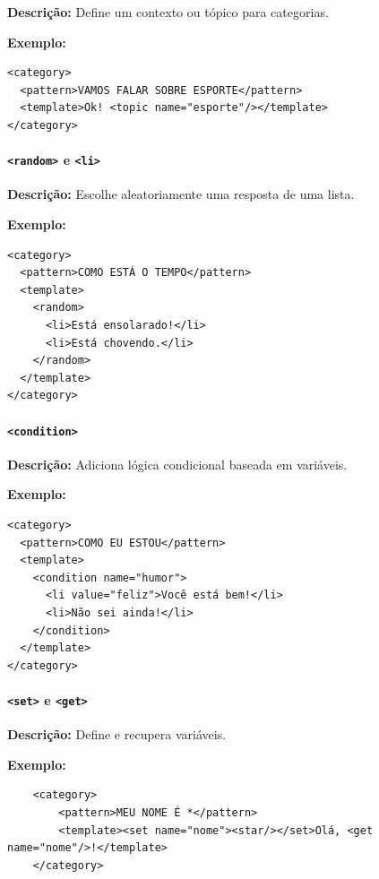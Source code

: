 \documentclass[a4paper,oneside]{book}
\begin{document}
\textbf{Descrição:} Define um contexto ou tópico para categorias. 

\textbf{Exemplo:}

\begin{verbatim}
<category>
  <pattern>VAMOS FALAR SOBRE ESPORTE</pattern>
  <template>Ok! <topic name="esporte"/></template>
</category>
\end{verbatim}

\paragraph{\texttt{<random>} e \texttt{<li>}} 

\textbf{Descrição:} Escolhe aleatoriamente uma resposta de uma lista. 

\textbf{Exemplo:}

\begin{verbatim}
<category>
  <pattern>COMO ESTÁ O TEMPO</pattern>
  <template>
    <random>
      <li>Está ensolarado!</li>
      <li>Está chovendo.</li>
    </random>
  </template>
</category>
\end{verbatim}

\paragraph{\texttt{<condition>}} 

\textbf{Descrição:} Adiciona lógica condicional baseada em variáveis. 

\textbf{Exemplo:}

\begin{verbatim}
<category>
  <pattern>COMO EU ESTOU</pattern>
  <template>
    <condition name="humor">
      <li value="feliz">Você está bem!</li>
      <li>Não sei ainda!</li>
    </condition>
  </template>
</category>
\end{verbatim}

\paragraph{\texttt{<set>} e \texttt{<get>}} 

\textbf{Descrição:} Define e recupera variáveis. 

\textbf{Exemplo:}

\begin{verbatim}
	<category>
		<pattern>MEU NOME É *</pattern>
		<template><set name="nome"><star/></set>Olá, <get name="nome"/>!</template>
	</category>
\end{verbatim}
\end{document}
